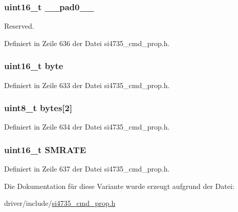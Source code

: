 \subsubsection[{\+\_\+\+\_\+pad0\+\_\+\+\_\+}]{\setlength{\rightskip}{0pt plus 5cm}uint16\+\_\+t \+\_\+\+\_\+pad0\+\_\+\+\_\+}\label{unionfm__soft__mute__rate_a77132c2c26a75f5b8751b235cda23828}


Reserved. 



Definiert in Zeile 636 der Datei si4735\+\_\+cmd\+\_\+prop.\+h.

\hypertarget{unionfm__soft__mute__rate_ab0549c1b5ea980a02e7eab77e21fea49}{}
\subsubsection[{byte}]{\setlength{\rightskip}{0pt plus 5cm}uint16\+\_\+t byte}\label{unionfm__soft__mute__rate_ab0549c1b5ea980a02e7eab77e21fea49}


Definiert in Zeile 633 der Datei si4735\+\_\+cmd\+\_\+prop.\+h.

\hypertarget{unionfm__soft__mute__rate_a46e4c05d20a047ec169f60d3167e912e}{}
\subsubsection[{bytes}]{\setlength{\rightskip}{0pt plus 5cm}uint8\+\_\+t bytes\mbox{[}2\mbox{]}}\label{unionfm__soft__mute__rate_a46e4c05d20a047ec169f60d3167e912e}


Definiert in Zeile 634 der Datei si4735\+\_\+cmd\+\_\+prop.\+h.

\hypertarget{unionfm__soft__mute__rate_aee04360e3c9299f145d4143333baaf9a}{}
\subsubsection[{S\+M\+R\+A\+T\+E}]{\setlength{\rightskip}{0pt plus 5cm}uint16\+\_\+t S\+M\+R\+A\+T\+E}\label{unionfm__soft__mute__rate_aee04360e3c9299f145d4143333baaf9a}


Definiert in Zeile 637 der Datei si4735\+\_\+cmd\+\_\+prop.\+h.



Die Dokumentation für diese Variante wurde erzeugt aufgrund der Datei\+:\begin{DoxyCompactItemize}
\item 
driver/include/\hyperlink{si4735__cmd__prop_8h}{si4735\+\_\+cmd\+\_\+prop.\+h}\end{DoxyCompactItemize}
